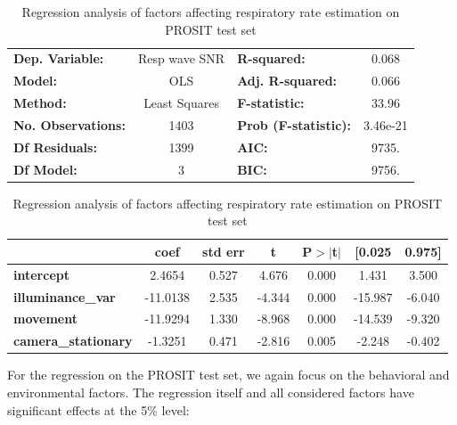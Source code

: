 \documentclass{article}
\begin{document}
\begin{table}[h!]
\begin{center}
\caption{Regression analysis of factors affecting respiratory rate estimation on PROSIT test set}
\label{tab:vv-rr-regression-prosit}
\begin{tabular}{lclc}
\toprule
\textbf{Dep. Variable:}          &  Resp wave SNR   & \textbf{  R-squared:         } &     0.068   \\
\textbf{Model:}                  &       OLS        & \textbf{  Adj. R-squared:    } &     0.066   \\
\textbf{Method:}                 &  Least Squares   & \textbf{  F-statistic:       } &     33.96   \\
\textbf{No. Observations:}       &        1403      & \textbf{  Prob (F-statistic):} &  3.46e-21   \\
\textbf{Df Residuals:}           &        1399      & \textbf{  AIC:               } &     9735.   \\
\textbf{Df Model:}               &           3      & \textbf{  BIC:               } &     9756.   \\
\bottomrule
\end{tabular}
\begin{tabular}{lcccccc}
                                 & \textbf{coef} & \textbf{std err} & \textbf{t} & \textbf{P$> |$t$|$} & \textbf{[0.025} & \textbf{0.975]}  \\
\midrule
\textbf{intercept}               &       2.4654  &        0.527     &     4.676  &         0.000        &        1.431    &        3.500     \\
\textbf{illuminance\_var}  		 &     -11.0138  &        2.535     &    -4.344  &         0.000        &      -15.987    &       -6.040     \\
\textbf{movement}                &     -11.9294  &        1.330     &    -8.968  &         0.000        &      -14.539    &       -9.320     \\
\textbf{camera\_stationary}      &      -1.3251  &        0.471     &    -2.816  &         0.005        &       -2.248    &       -0.402     \\
\bottomrule
\end{tabular}
\end{center}
\end{table}

For the regression on the PROSIT test set, we again focus on the behavioral and environmental factors.
The regression itself and all considered factors have significant effects at the 5\% level:
\end{document}
